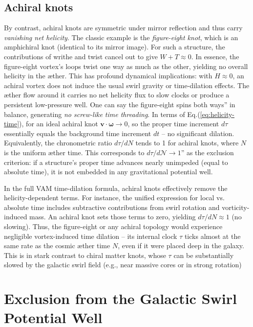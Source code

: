 \documentclass[11pt]{article}
\begin{document}
\subsection*{Achiral knots}
By contrast, achiral knots are symmetric under mirror reflection and thus carry \textit{vanishing net helicity}. The classic example is the \textit{figure-eight knot}, which is an amphichiral knot (identical to its mirror image). For such a structure, the contributions of writhe and twist cancel out to give $W+T \approx 0$. In essence, the figure-eight vortex's loops twist one way as much as the other, yielding no overall helicity in the \ae ther. This has profound dynamical implications: with $H \approx 0$, an achiral vortex does not induce the usual swirl gravity or time-dilation effects. The \ae ther flow around it carries no net helicity flux to slow clocks or produce a persistent low-pressure well. One can say the figure-eight spins both ways'' in balance, generating \textit{no screw-like time threading}. In terms of Eq.(\ref{eq:helicity-time}), for an ideal achiral knot $\mathbf{v}\cdot\boldsymbol{\omega}\to 0$, so the proper time increment $d\tau$ essentially equals the background time increment $dt$ -- no significant dilation. Equivalently, the chronometric ratio $d\tau/dN$ tends to 1 for achiral knots, where $N$ is the uniform \ae ther time. This corresponds to $d\tau/d\mathcal{N} \to 1$'' as the exclusion criterion: if a structure's proper time advances nearly unimpeded (equal to absolute time), it is not embedded in any gravitational potential well.


In the full VAM time-dilation formula, achiral knots effectively remove the helicity-dependent terms. For instance, the unified expression for local vs. absolute time includes subtractive contributions from swirl rotation and vorticity-induced mass. An achiral knot sets those terms to zero, yielding $d\tau/dN \approx 1$ (no slowing). Thus, the figure-eight or any achiral topology would experience negligible vortex-induced time dilation -- its internal clock $\tau$ ticks almost at the same rate as the cosmic \ae ther time $N$, even if it were placed deep in the galaxy. This is in stark contrast to chiral matter knots, whose $\tau$ can be substantially slowed by the galactic swirl field (e.g., near massive cores or in strong rotation)




\section*{Exclusion from the Galactic Swirl Potential Well}
\end{document}

